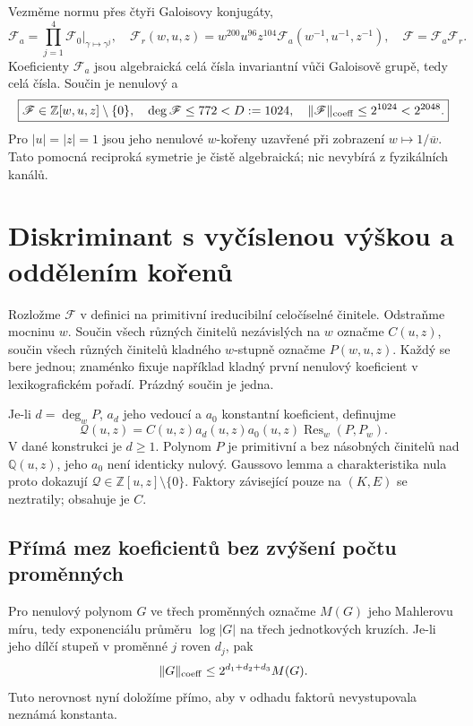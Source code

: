 \documentclass[11pt,a4paper]{article}
\theoremstyle{remark}\newtheorem{remark}[theorem]{Poznámka}
\numberwithin{equation}{section}
\begin{document}
Vezměme normu přes čtyři Galoisovy konjugáty,
\[
\mathscr F_a=\prod_{j=1}^4\mathscr F_0|_{\gamma\mapsto\gamma^j},
\quad
\mathscr F_r(w,u,z)=w^{200}u^{96}z^{104}
\mathscr F_a(w^{-1},u^{-1},z^{-1}),
\quad \mathscr F=\mathscr F_a\mathscr F_r.
\]
Koeficienty \(\mathscr F_a\) jsou algebraická celá čísla invariantní vůči Galoisově grupě, tedy celá čísla. Součin je nenulový a
\begin{equation}
\boxed{\mathscr F\in\mathbb Z[w,u,z]\setminus\{0\},\quad
\deg\mathscr F\le772<D:=1024,\quad
\|\mathscr F\|_{\rm coeff}\le2^{1024}<2^{2048}.}
\label{eq:rawFbound}
\end{equation}
Pro \(|u|=|z|=1\) jsou jeho nenulové \(w\)-kořeny uzavřené při zobrazení \(w\mapsto1/\overline w\). Tato pomocná reciproká symetrie je čistě algebraická; nic nevybírá z fyzikálních kanálů.

\section{Diskriminant s vyčíslenou výškou a oddělením kořenů}
\label{sec:discriminant}

Rozložme \(\mathscr F\) v definici na primitivní ireducibilní celočíselné činitele. Odstraňme mocninu \(w\). Součin všech různých činitelů nezávislých na \(w\) označme \(C(u,z)\), součin všech různých činitelů kladného \(w\)-stupně označme \(P(w,u,z)\). Každý se bere jednou; znaménko fixuje například kladný první nenulový koeficient v lexikografickém pořadí. Prázdný součin je jedna.

Je-li \(d=\deg_wP\), \(a_d\) jeho vedoucí a \(a_0\) konstantní koeficient, definujme
\begin{equation}
\boxed{\mathscr Q(u,z)=C(u,z)a_d(u,z)a_0(u,z)
\operatorname{Res}_w(P,P_w).}
\label{eq:Qdisc}
\end{equation}
V dané konstrukci je \(d\ge1\). Polynom \(P\) je primitivní a bez násobných činitelů nad \(\mathbb Q(u,z)\), jeho \(a_0\) není identicky nulový. Gaussovo lemma a charakteristika nula proto dokazují \(\mathscr Q\in\mathbb Z[u,z]\setminus\{0\}\). Faktory závisející pouze na \((K,E)\) se neztratily; obsahuje je \(C\).

\subsection{Přímá mez koeficientů bez zvýšení počtu proměnných}

Pro nenulový polynom \(G\) ve třech proměnných označme \(M(G)\) jeho Mahlerovu míru, tedy exponenciálu průměru \(\log|G|\) na třech jednotkových kruzích. Je-li jeho dílčí stupeň v proměnné \(j\) roven \(d_j\), pak
\begin{equation}
\|G\|_{\rm coeff}\le2^{d_1+d_2+d_3}M(G).
\label{eq:multimahler}
\end{equation}
Tuto nerovnost nyní doložíme přímo, aby v odhadu faktorů nevystupovala neznámá konstanta.
\end{document}
